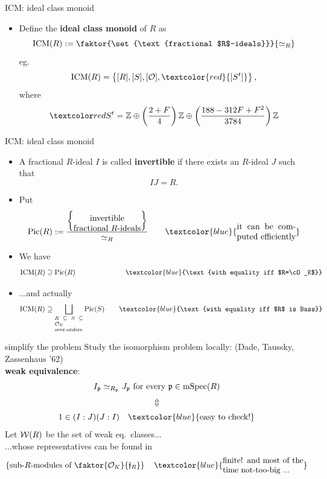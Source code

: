 \documentclass{beamer}
\newcommand{\isoclass}[1]{[#1]}
\begin{document}
\begin{frame}{ICM: ideal class monoid}
\begin{itemize}
\item Define the \textbf{ideal class monoid} of $R$ as
\[\ICM(R) := \faktor{\set{\text{fractional $R$-ideals}}}{\simeq_R}\]
     \pause  eg. \[ \ICM(R) = \set{ \isoclass{R},\isoclass{S},\isoclass{\cO},\textcolor{red}{\isoclass{S^t}}}, \]
	 where 
	  \[ \red{S^t}=\Z\oplus \left(\frac{2+F}{4}\right)\Z\oplus \left(\frac{188 -312 F + F^2}{3784} \right)\Z \]
\end{itemize}
\end{frame}

\begin{frame}{ICM: ideal class monoid}
 \begin{itemize}
   \item A fractional $R$-ideal $I$ is called \textbf{invertible} if there exists an $R$-ideal $J$ such that 
   \[ IJ = R. \]
   \pause \item Put
   \vspace{-1 em}\[ \Pic(R) := \dfrac{\set{\parbox{8 em}{\center\vspace{-0.5 em} invertible\\ fractional $R$-ideals}}}{\simeq_R} \qquad \textcolor{blue}{\parbox{7 em}{it can be computed efficiently}}\]
   \pause \item We have
   \[ \ICM(R) \supseteq \Pic(R) \hspace{2.5 cm} \textcolor{blue}{\text{with equality iff $R=\cO_K$}} \]
   \pause \item ...and actually
   \[ \ICM(R) \supseteq \bigsqcup_{\scriptsize\parbox{5 em}{$R\subseteq S \subseteq \cO_K$\\over-orders}}\Pic(S) \qquad \textcolor{blue}{\text{with equality iff $R$ is Bass}} \]
\end{itemize}
\end{frame}

\begin{frame}{simplify the problem}
   Study the isomorphism problem locally: (Dade, Taussky, Zassenhaus '62)\\
\pause  \textbf{weak equivalence}:
\[I_{\mathfrak p}\simeq_{R_{\mathfrak p}} J_{\mathfrak p} \text{ for every }{\mathfrak p}\in \operatorname{mSpec}(R)\]
\pause \vspace{-6mm}\[\Updownarrow\]
\[1\in (I:J)(J:I)\quad \textcolor{blue}{\text{easy to check!}}\]
\pause Let ${\mathcal W}(R)$ be the set of weak eq.~classes...\\
\pause ...whose representatives can be found in
	\[\set{\text{sub-$R$-modules of $\faktor{\cO_K}{\frf_R}$}}\quad \textcolor{blue}{\parbox{10 em}{finite! and most of the time not-too-big ...}}\]
\end{frame}
\end{document}
